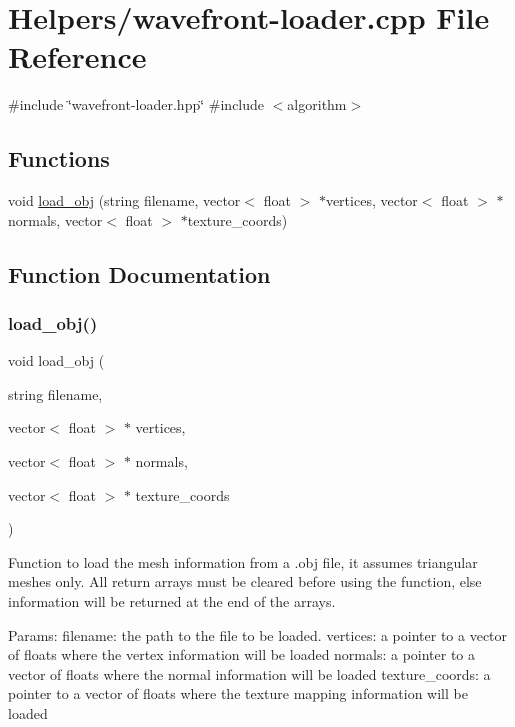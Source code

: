 \hypertarget{wavefront-loader_8cpp}{}\section{Helpers/wavefront-\/loader.cpp File Reference}
\label{wavefront-loader_8cpp}
{\ttfamily \#include \char`\"{}wavefront-\/loader.\+hpp\char`\"{}}\newline
{\ttfamily \#include $<$algorithm$>$}\newline
\subsection*{Functions}
\begin{DoxyCompactItemize}
\item 
void \mbox{\hyperlink{wavefront-loader_8cpp_a89af5666d4c35dc6cf781bd7fbec33bd}{load\+\_\+obj}} (string filename, vector$<$ float $>$ $\ast$vertices, vector$<$ float $>$ $\ast$normals, vector$<$ float $>$ $\ast$texture\+\_\+coords)
\end{DoxyCompactItemize}


\subsection{Function Documentation}
\mbox{\label{wavefront-loader_8cpp_a89af5666d4c35dc6cf781bd7fbec33bd}} 
\subsubsection{\texorpdfstring{load\+\_\+obj()}{load\_obj()}}
{\footnotesize\ttfamily void load\+\_\+obj (\begin{DoxyParamCaption}\item[{string}]{filename,  }\item[{vector$<$ float $>$ $\ast$}]{vertices,  }\item[{vector$<$ float $>$ $\ast$}]{normals,  }\item[{vector$<$ float $>$ $\ast$}]{texture\+\_\+coords }\end{DoxyParamCaption})}

Function to load the mesh information from a .obj file, it assumes triangular meshes only. All return arrays must be cleared before using the function, else information will be returned at the end of the arrays.

Params\+: filename\+: the path to the file to be loaded. vertices\+: a pointer to a vector of floats where the vertex information will be loaded normals\+: a pointer to a vector of floats where the normal information will be loaded texture\+\_\+coords\+: a pointer to a vector of floats where the texture mapping information will be loaded 